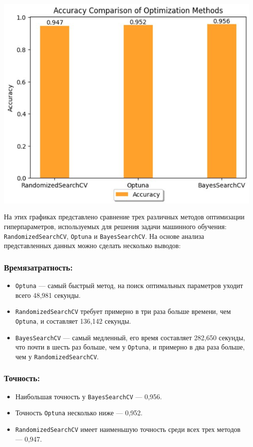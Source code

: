 \documentclass{article}
\begin{document}
\begin{center}
    \includegraphics[width=\textwidth]{figures/accuracy.jpg}
\end{center}

На этих графиках представлено сравнение трех различных методов оптимизации гиперпараметров, используемых для решения задачи машинного обучения: \texttt{RandomizedSearchCV}, \texttt{Optuna} и \texttt{BayesSearchCV}. На основе анализа представленных данных можно сделать несколько выводов:

\subsubsection{Времязатратность:}
\begin{itemize}
  \item \texttt{Optuna} --- самый быстрый метод, на поиск оптимальных параметров уходит всего 48,981 секунды.
  \item \texttt{RandomizedSearchCV} требует примерно в три раза больше времени, чем \texttt{Optuna}, и составляет 136,142 секунды.
  \item \texttt{BayesSearchCV} --- самый медленный, его время составляет 282,650 секунды, что почти в шесть раз больше, чем у \texttt{Optuna}, и примерно в два раза больше, чем у \texttt{RandomizedSearchCV}.
\end{itemize}

\subsubsection{Точность:}
\begin{itemize}
  \item Наибольшая точность у \texttt{BayesSearchCV} --- 0,956.
  \item Точность \texttt{Optuna} несколько ниже --- 0,952.
  \item \texttt{RandomizedSearchCV} имеет наименьшую точность среди всех трех методов --- 0,947.
\end{itemize}
\end{document}

